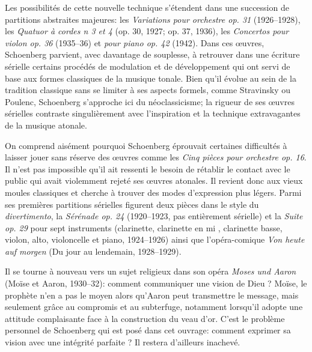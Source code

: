 \documentclass[11pt,a4paper]{scrreprt}
\begin{document}
Les possibilités de cette nouvelle technique s'étendent dans une succession de partitions abstraites majeures: les \emph{Variations pour orchestre op. 31} (1926--1928), les \emph{Quatuor à cordes n 3 et 4} (op. 30, 1927; op. 37, 1936), les \emph{Concertos pour violon op. 36} (1935--36) et \emph{pour piano op. 42} (1942). Dans ces \oe{}uvres, Schoenberg parvient, avec davantage de souplesse, à retrouver dans une écriture sérielle certains procédés de modulation et de développement qui ont servi de base aux formes classiques de la musique tonale. Bien qu'il évolue au sein de la tradition classique sans se limiter à ses aspects formels, comme Stravinsky ou Poulenc, Schoenberg s'approche ici du néoclassicisme; la rigueur de ses \oe{}uvres sérielles contraste singulièrement avec l'inspiration et la technique extravagantes de la musique atonale.

On comprend aisément pourquoi Schoenberg éprouvait certaines difficultés à laisser jouer sans réserve des \oe{}uvres comme les \emph{Cinq pièces pour orchestre op. 16}. Il n'est pas impossible qu'il ait ressenti le besoin de rétablir le contact avec le public qui avait violemment rejeté ses \oe{}uvres atonales. Il revient donc aux vieux moules classiques et cherche à trouver des modes d'expression plus légers. Parmi ses premières partitions sérielles figurent deux pièces dans le style du \emph{divertimento}, la \emph{Sérénade op. 24} (1920--1923, pas entièrement sérielle) et la \emph{Suite op. 29} pour sept instruments (clarinette, clarinette en mi \fetaflat{}, clarinette basse, violon, alto, violoncelle et piano, 1924--1926) ainsi que l'opéra-comique \emph{Von heute auf morgen} (Du jour au lendemain, 1928--1929).

Il se tourne à nouveau vers un sujet religieux dans son opéra \emph{Moses und Aaron} (Moïse et Aaron, 1930--32): comment communiquer une vision de Dieu ? Moïse, le prophète n'en a pas le moyen alors qu'Aaron peut transmettre le message, mais seulement grâce au compromis et au subterfuge, notamment lorsqu'il adopte une attitude complaisante face à la construction du veau d'or. C'est le problème personnel de Schoenberg qui est posé dans cet ouvrage: comment exprimer sa vision avec une intégrité parfaite ? Il restera d'ailleurs inachevé.
\end{document}
